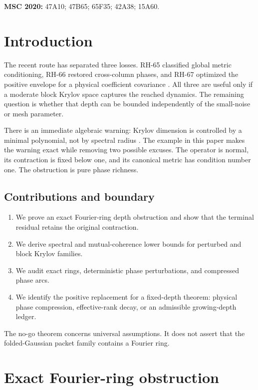\documentclass[11pt]{article}
\begin{document}
\medskip
\noindent\textbf{MSC 2020:} 47A10; 47B65; 65F35; 42A38; 15A60.

\section{Introduction}

The recent route has separated three losses.  RH-65 classified global metric
conditioning, RH-66 restored cross-column phases, and RH-67 optimized the
positive envelope for a physical coefficient covariance
\citep{WangCovarianceEnvelope2026}.  All three are useful only if a moderate
block Krylov space captures the reached dynamics.  The remaining question is
whether that depth can be bounded independently of the small-noise or mesh
parameter.

There is an immediate algebraic warning: Krylov dimension is controlled by a
minimal polynomial, not by spectral radius \citep{Saad2003}.  The example in
this paper makes the warning exact while removing two possible excuses.  The
operator is normal, its contraction is fixed below one, and its canonical
metric has condition number one.  The obstruction is pure phase richness.

\subsection*{Contributions and boundary}

\begin{enumerate}[leftmargin=2.2em]
 \item We prove an exact Fourier-ring depth obstruction and show that the
       terminal residual retains the original contraction.
 \item We derive spectral and mutual-coherence lower bounds for perturbed and
       block Krylov families.
 \item We audit exact rings, deterministic phase perturbations, and compressed
       phase arcs.
 \item We identify the positive replacement for a fixed-depth theorem:
       physical phase compression, effective-rank decay, or an admissible
       growing-depth ledger.
\end{enumerate}

The no-go theorem concerns universal assumptions.  It does not assert that
the folded-Gaussian packet family contains a Fourier ring.

\section{Exact Fourier-ring obstruction}
\label{sec:ring}
\end{document}
